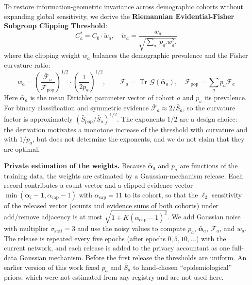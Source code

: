 \documentclass[pdflatex,sn-vancouver-num,referee,lineno]{sn-jnl}
\theoremstyle{thmstyleone}
\theoremstyle{thmstylethree}
\begin{document}
To restore information-geometric invariance across demographic cohorts without expanding global sensitivity, we derive the \textbf{Riemannian Evidential-Fisher Subgroup Clipping Threshold}:
\begin{equation}
    C_a^* = C_0 \cdot \tilde{w}_a, \quad \tilde{w}_a = \frac{w_a}{\sqrt{\sum_{a'} p_{a'} w_{a'}^2}}
\end{equation}
where the clipping weight $w_a$ balances the demographic prevalence and the Fisher curvature ratio:
\begin{equation}
    w_a = \left( \frac{\bar{\mathcal{F}}_a}{\bar{\mathcal{F}}_{\text{pop}}} \right)^{1/2} \cdot \left( \frac{1}{2 p_a} \right)^{1/2}, \qquad \bar{\mathcal{F}}_a = \operatorname{Tr}\,\mathcal{G}(\bar{\boldsymbol{\alpha}}_a), \quad \bar{\mathcal{F}}_{\text{pop}} = \sum_a p_a \bar{\mathcal{F}}_a
\end{equation}
Here $\bar{\boldsymbol{\alpha}}_a$ is the mean Dirichlet parameter vector of cohort $a$ and $p_a$ its prevalence. For binary classification and symmetric evidence $\bar{\mathcal{F}}_a \approx 2/\bar{S}_a$, so the curvature factor is approximately $(\bar{S}_{\text{pop}}/\bar{S}_a)^{1/2}$. The exponents $1/2$ are a design choice: the derivation motivates a monotone increase of the threshold with curvature and with $1/p_a$, but does not determine the exponents, and we do not claim that they are optimal.

\noindent \textbf{Private estimation of the weights.} Because $\bar{\boldsymbol{\alpha}}_a$ and $p_a$ are functions of the training data, the weights are estimated by a Gaussian-mechanism release. Each record contributes a count vector and a clipped evidence vector $\min(\boldsymbol{\alpha}_i - \mathbf{1}, \alpha_{\text{cap}} - 1)$ with $\alpha_{\text{cap}} = 11$ to its cohort, so that the $\ell_2$ sensitivity of the released vector (counts and evidence sums of both cohorts) under add/remove adjacency is at most $\sqrt{1 + K(\alpha_{\text{cap}}-1)^2}$. We add Gaussian noise with multiplier $\sigma_{\text{stat}} = 3$ and use the noisy values to compute $p_a$, $\bar{\boldsymbol{\alpha}}_a$, $\bar{\mathcal{F}}_a$, and $w_a$. The release is repeated every five epochs (after epochs $0, 5, 10, \dots$) with the current network, and each release is added to the privacy accountant as one full-data Gaussian mechanism. Before the first release the thresholds are uniform. An earlier version of this work fixed $p_a$ and $\bar{S}_a$ to hand-chosen ``epidemiological'' priors, which were not estimated from any registry and are not used here.
\end{document}
